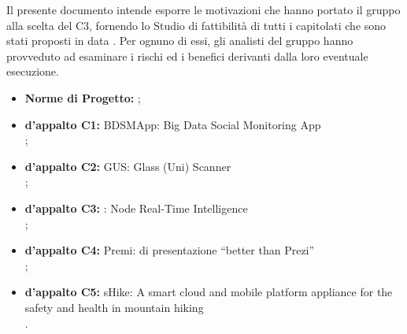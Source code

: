 
		Il presente documento intende esporre le motivazioni che hanno portato il gruppo alla scelta del  C3, fornendo lo Studio di fattibilità di tutti i capitolati che sono stati proposti in data . Per ognuno di essi, gli analisti del gruppo hanno provveduto ad esaminare i rischi ed i benefici derivanti dalla loro eventuale esecuzione.
	
	



			\begin{itemize}
				\item \textbf{Norme di Progetto:} ;
				\item \textbf{ d'appalto C1:} BDSMApp: Big Data Social Monitoring App\\
					;
				\item \textbf{ d'appalto C2:} GUS: Glass (Uni) Scanner\\
					;
				\item \textbf{ d'appalto C3:} \projectname: Node Real-Time Intelligence\\
					;
				\item \textbf{ d'appalto C4:} Premi:  di presentazione “better than Prezi”\\
					;
				\item \textbf{ d'appalto C5:} sHike: A smart cloud and mobile platform appliance for the safety and health in mountain hiking\\
					.
			\end{itemize}

